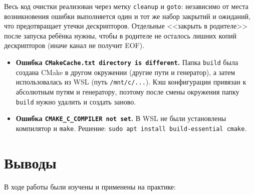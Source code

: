 \documentclass[11pt, a4paper]{article}
\begin{document}
Весь код очистки реализован через метку \texttt{cleanup} и \texttt{goto}:
независимо от места возникновения ошибки выполняется один и тот же
набор закрытий и ожиданий, что предотвращает утечки дескрипторов.
Отдельные <<закрыть в родителе>> после запуска ребёнка нужны, чтобы
в родителе не осталось лишних копий дескрипторов (иначе канал
не получит EOF).


\begin{itemize}
  \item \textbf{Ошибка \texttt{CMakeCache.txt directory is different}.}
        Папка \texttt{build} была создана CMake в другом окружении (другие
        пути и генератор), а затем использовалась из WSL
        (путь \texttt{/\allowbreak{}mnt/\allowbreak{}c/\allowbreak{}...}). Кэш конфигурации привязан к абсолютным
        путям и генератору, поэтому после смены окружения папку
        \texttt{build} нужно удалить и создать заново.
  \item \textbf{Ошибка \texttt{CMAKE\_\allowbreak{}C\_\allowbreak{}COMPILER not set}.} В WSL не были
        установлены компилятор и \texttt{make}. Решение:
        \texttt{sudo apt install build-essential cmake}.
\end{itemize}

\section{Выводы}

В ходе работы были изучены и применены на практике:
\end{document}

